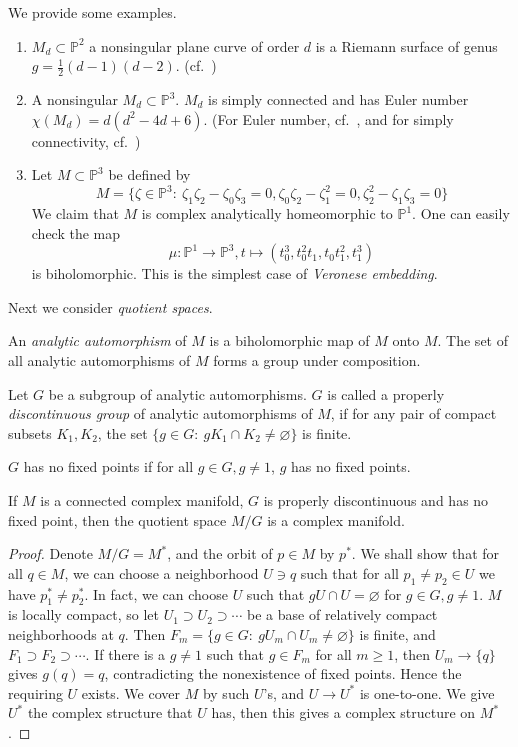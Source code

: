 \begin{eg}
    We provide some examples.
    \begin{enumerate}
        \item $M_d\subset\mathbb{P}^2$ a nonsingular plane curve of order $d$ is a Riemann surface of genus $g=\frac{1}{2}(d-1)(d-2)$. (cf.~\cite[pp.\ 219--221]{G-H})
        \item A nonsingular $M_d\subset\mathbb{P}^3$.
        $M_d$ is simply connected and has Euler number $\chi(M_d)=d(d^2-4d+6)$.
        (For Euler number, cf.~\cite[Section 10.2, Equation (5)]{Hirzebruch95}, and for simply connectivity, cf.~\cite[Theorem 7.4]{Milnor63})
        \item Let $M\subset\mathbb{P}^3$ be defined by
        \[M=\{\zeta\in\mathbb{P}^3:\ \zeta_1\zeta_2-\zeta_0\zeta_3=0,\zeta_0\zeta_2-\zeta_1^2=0,\zeta_2^2-\zeta_1\zeta_3=0\}\]
        We claim that $M$ is complex analytically homeomorphic to $\mathbb{P}^1$.
        One can easily check the map
        \[\mu:\mathbb{P}^1\to\mathbb{P}^3,t\mapsto(t_0^3,t_0^2t_1,t_0t_1^2,t_1^3)\]
        is biholomorphic.
        This is the simplest case of \emph{Veronese embedding}.
    \end{enumerate}
\end{eg}

Next we consider \emph{quotient spaces}.

\begin{defn}
    An \emph{analytic automorphism} of $M$ is a biholomorphic map of $M$ onto $M$.
    The set of all analytic automorphisms of $M$ forms a group under composition.

    Let $G$ be a subgroup of analytic automorphisms.
    $G$ is called a properly \emph{discontinuous group} of analytic automorphisms of $M$, if for any pair of compact subsets $K_1,K_2$, the set $\{g\in G:\ gK_1\cap K_2\neq\varnothing\}$ is finite.

    $G$ has no fixed points if for all $g\in G,g\neq 1$, $g$ has no fixed points.
\end{defn}

\begin{thm}
    If $M$ is a connected complex manifold, $G$ is properly discontinuous and has no fixed point,  then the quotient space $M/G$ is a complex manifold.
\end{thm}
\begin{proof}
    Denote $M/G=M^*$, and the orbit of $p\in M$ by $p^*$.
    We shall show that for all $q\in M$, we can choose a neighborhood $U\ni q$ such that for all $p_1\neq p_2\in U$ we have $p_1^*\neq p_2^*$.
    In fact, we can choose $U$ such that $gU\cap U=\varnothing$ for $g\in G,g\neq 1$.
    $M$ is locally compact, so let $U_1\supset U_2\supset\cdots$ be a base of relatively compact neighborhoods at $q$.
    Then $F_m=\{g\in G:\ gU_m\cap U_m\neq\varnothing\}$ is finite, and $F_1\supset F_2\supset\cdots$.
    If there is a $g\neq 1$ such that $g\in F_m$ for all $m\geq 1$, then $U_m\to \{q\}$ gives $g(q)=q$, contradicting the nonexistence of fixed points.
    Hence the requiring $U$ exists.
    We cover $M$ by such $U$'s, and $U\to U^*$ is one-to-one.
    We give $U^*$ the complex structure that $U$ has, then this gives a complex structure on $M^*$.
\end{proof}

